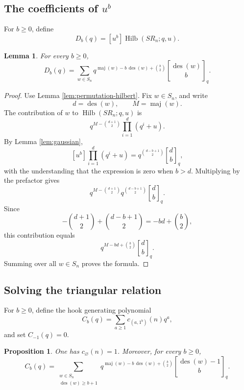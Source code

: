 \documentclass[12pt]{article}
\newtheorem{lemma}[theorem]{Lemma}
\newtheorem{proposition}[theorem]{Proposition}
\DeclareMathOperator{\Hilb}{Hilb}
\DeclareMathOperator{\des}{des}
\DeclareMathOperator{\maj}{maj}
\newcommand{\qbinom}[2]{\genfrac{[}{]}{0pt}{}{#1}{#2}_q}
\begin{document}
\subsection{The coefficients of \(u^b\)}

For \(b\ge 0\), define
\[
D_b(q)=[u^b]\Hilb(SR_n;q,u).
\]

\begin{lemma}\label{lem:Db}
For every \(b\ge 0\),
\[
D_b(q)
=
\sum_{w\in S_n}
q^{\maj(w)-b\,\des(w)+\binom{b}{2}}
\qbinom{\des(w)}{b}.
\]
\end{lemma}

\begin{proof}
Use Lemma \ref{lem:permutation-hilbert}.  Fix \(w\in S_n\), and write
\[
d=\des(w),\qquad M=\maj(w).
\]
The contribution of \(w\) to \(\Hilb(SR_n;q,u)\) is
\[
q^{M-\binom{d+1}{2}}\prod_{i=1}^{d}(q^i+u).
\]
By Lemma \ref{lem:gaussian},
\[
[u^b]\prod_{i=1}^{d}(q^i+u)
=
q^{\binom{d-b+1}{2}}\qbinom{d}{b},
\]
with the understanding that the expression is zero when \(b>d\).  Multiplying by the prefactor gives
\[
q^{M-\binom{d+1}{2}}
q^{\binom{d-b+1}{2}}
\qbinom{d}{b}.
\]
Since
\[
-\binom{d+1}{2}+\binom{d-b+1}{2}
=
-bd+\binom{b}{2},
\]
this contribution equals
\[
q^{M-bd+\binom{b}{2}}\qbinom{d}{b}.
\]
Summing over all \(w\in S_n\) proves the formula.
\end{proof}

\subsection{Solving the triangular relation}

For \(b\ge 0\), define the hook generating polynomial
\[
C_b(q)=\sum_{a\ge 1}c_{(a,1^b)}(n)q^a,
\]
and set \(C_{-1}(q)=0\).

\begin{proposition}\label{prop:Cb}
One has \(c_{\varnothing}(n)=1\).  Moreover, for every \(b\ge 0\),
\[
C_b(q)
=
\sum_{\substack{w\in S_n\\ \des(w)\ge b+1}}
q^{\maj(w)-b\,\des(w)+\binom{b}{2}}
\qbinom{\des(w)-1}{b}.
\]
\end{proposition}
\end{document}
